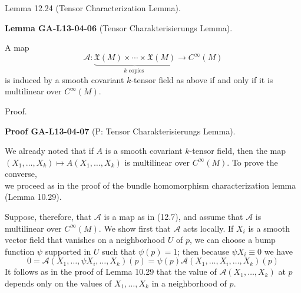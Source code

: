 \documentclass[10pt, letterpaper]{article}
\newcommand{\CustomHeading}[3]{%
  \par\medskip\noindent%
  \textbf{#1 #2} \textnormal{(#3)}.\enskip%
}
\newenvironment{LEM}[2]{\begin{unitbox}\CustomHeading{Lemma}{#1}{#2}}{\end{unitbox}}
\newenvironment{PROOF}[2]{\begin{unitbox}\CustomHeading{Proof}{#1}{#2}}{\end{unitbox}}
\begin{document}
Lemma 12.24 (Tensor Characterization Lemma). 



\begin{LEM}{GA-L13-04-06}{Tensor Charakterisierungs Lemma}
A map
$$
\mathcal{A}: \underbrace{\mathfrak{X}(M) \times \cdots \times \mathfrak{X}(M)}_{k \text { copies }} \rightarrow C^{\infty}(M)
$$
is induced by a smooth covariant $k$-tensor field as above if and only if it is multilinear over $C^{\infty}(M)$.
\end{LEM}

Proof. 


\begin{PROOF}{GA-L13-04-07}{P: Tensor Charakterisierungs Lemma}
We already noted that if $A$ is a smooth covariant $k$-tensor field, then the map $\left(X_{1}, \ldots, X_{k}\right) \mapsto A\left(X_{1}, \ldots, X_{k}\right)$ is multilinear over $C^{\infty}(M)$. To prove the converse,\\
we proceed as in the proof of the bundle homomorphism characterization lemma (Lemma 10.29).

Suppose, therefore, that $\mathscr{A}$ is a map as in (12.7), and assume that $\mathscr{A}$ is multilinear over $C^{\infty}(M)$. We show first that $\mathscr{A}$ acts locally. If $X_{i}$ is a smooth vector field that vanishes on a neighborhood $U$ of $p$, we can choose a bump function $\psi$ supported in $U$ such that $\psi(p)=1$; then because $\psi X_{i} \equiv 0$ we have
$$
0=\mathscr{A}\left(X_{1}, \ldots, \psi X_{i}, \ldots, X_{k}\right)(p)=\psi(p) \mathscr{A}\left(X_{1}, \ldots, X_{i}, \ldots, X_{k}\right)(p)
$$
It follows as in the proof of Lemma 10.29 that the value of $\mathscr{A}\left(X_{1}, \ldots, X_{k}\right)$ at $p$ depends only on the values of $X_{1}, \ldots, X_{k}$ in a neighborhood of $p$.


\end{PROOF}
\end{document}
